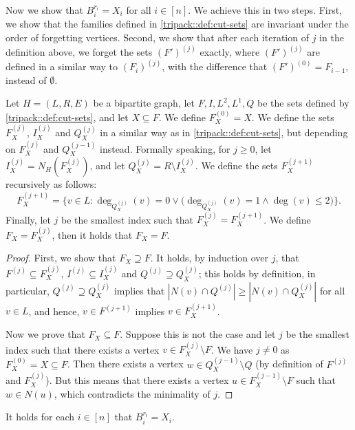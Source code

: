\documentclass[a4paper,UKenglish,cleveref, autoref, thm-restate]{lipics-v2021}
\begin{document}
Now we show that $B_i^{r_i} = X_i$ for all $i\in[n]$. We achieve this in two steps. First, we show that the families defined in \cref{tripack::def:cut-sets} are invariant under the order of forgetting vertices. Second, we show that after each iteration of $j$ in the definition above, we forget the sets $(F')^{(j)}$ exactly, where $(F')^{(j)}$ are defined in a similar way to $(F_i)^{(j)}$, with the difference that $(F')^{(0)} = F_{i-1}$, instead of $\emptyset$.
 
\begin{lemma}\label{tripack::lem:cut-sets-order-irrelevant}
    Let $H=(L,R,E)$ be a bipartite graph, let $F, I, L^2, L^1, Q$ be the sets defined by \cref{tripack::def:cut-sets}, and let $X\subseteq F$. We define $F^{(0)}_X = X$. We define the sets $F^{(j)}_X$, $I^{(j)}_X$ and $Q^{(j)}_X$ in a similar way as in \cref{tripack::def:cut-sets}, but depending on $F^{(j)}_X$ and $Q^{(j-1)}_X$ instead. Formally speaking, for $j\geq 0$, let $I^{(j)}_X = N_H(F^{(j)}_X)$, and  let $Q^{(j)}_X = R\setminus I^{(j)}_X$. 
    We define the sets $F^{(j+1)}_X$ recursively as follows:
    \[
        F^{(j+1)}_X = \big\{v\in L\colon \deg_{Q^{(j)}_X}(v) = 0 \lor \big(\deg_{Q^{(j)}_X}(v) = 1 \land \deg(v) \leq 2\big)\big\}.
    \]
    Finally, let $j$ be the smallest index such that $F^{(j)}_X = F^{(j+1)}_X$. We define $F_X = F^{(j)}_X$, then it holds that $F_X = F$.
\end{lemma}

\begin{proof}
    First, we show that $F_X\supseteq F$. It holds, by induction over $j$, that $F^{(j)}\subseteq F^{(j)}_X$, $I^{(j)}\subseteq I^{(j)}_X$ and $Q^{(j)} \supseteq Q^{(j)}_X$;
    this holds by definition, in particular, $Q^{(j)} \supseteq Q^{(j)}_X$ implies that $|N(v)\cap Q^{(j)}|\geq |N(v)\cap Q^{(j)}_X|$ for all $v\in L$, and hence, $v\in F^{(j+1)}$ implies $v\in F^{(j+1)}_X$.

    Now we prove that $F_X\subseteq F$. Suppose this is not the case and let $j$ be the smallest index such that there exists a vertex $v \in F^{(j)}_X \setminus F$. 
    We have $j\neq 0$ as $F^{(0)}_X = X\subseteq F$. 
    Then there exists a vertex $w\in Q^{(j-1)}_X\setminus Q$ (by definition of $F^{(j)}$ and $F^{(j)}_X$). 
    But this means that there exists a vertex $u\in F^{(j-1)}_X\setminus F$ such that $w\in N(u)$, which contradicts the minimality of $j$.
\end{proof}

\begin{corollary}\label{tripack::cor:process-yeilds-cut-set-bag}
    It holds for each $i\in[n]$ that $B_i^{r_i} = X_i$.
\end{corollary}
\end{document}
